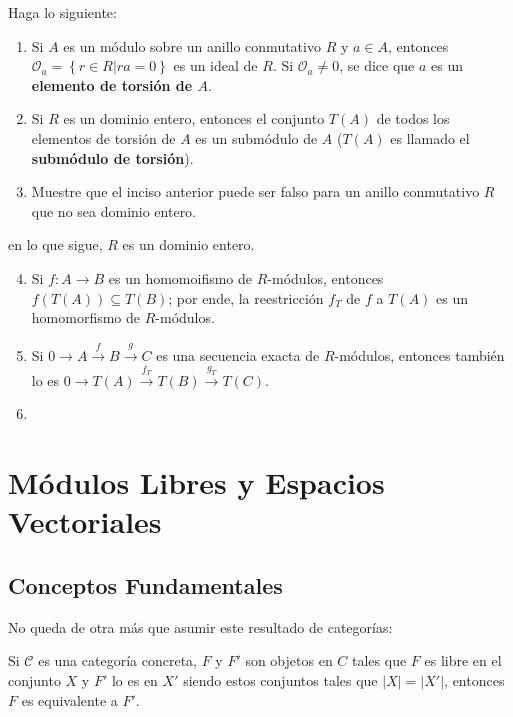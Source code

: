 \documentclass[12pt]{report}
\newcounter{it}
\theoremstyle{largebreak}
\newcommand\abs[1]{\ensuremath{\big|#1\big|}}
\newcommand\cf[3]{\ensuremath{#1:#2\rightarrow#3}}
\begin{document}
    \begin{excer}
        Haga lo siguiente:
        \begin{enumerate}[label = \textit{(\alph*)}]
            \item Si $A$ es un módulo sobre un anillo conmutativo $R$ y $a\in A$, entonces $\mathcal{O}_a=\left\{r\in R\Big|ra=0 \right\}$ es un ideal de $R$. Si $\mathcal{O}_a\neq0$, se dice que $a$ es un \textbf{elemento de torsión de $A$}.
            \item Si $R$ es un dominio entero, entonces el conjunto $T(A)$ de todos los elementos de torsión de $A$ es un submódulo de $A$ ($T(A)$ es llamado el \textbf{submódulo de torsión}).
            \item Muestre que el inciso anterior puede ser falso para un anillo conmutativo $R$ que no sea dominio entero.
        \end{enumerate}
        en lo que sigue, $R$ es un dominio entero.
        \begin{enumerate}[label = \textit{(\alph*)}]
            \setcounter{enumi}{3}
            \item Si $\cf{f}{A}{B}$ es un homomoifismo de $R$-módulos, entonces $f(T(A))\subseteq T(B)$; por ende, la reestricción $f_T$ de $f$ a $T(A)$ es un homomorfismo de $R$-módulos.
            \item Si $0\rightarrow A\overset{f}{\rightarrow}B\overset{g}{\rightarrow}C$ es una secuencia exacta de $R$-módulos, entonces también lo es $0\rightarrow T(A)\overset{f_T}{\rightarrow}T(B)\overset{g_T}{\rightarrow}T(C)$.
            \item 
        \end{enumerate}
    \end{excer}

    \newpage

    \chapter{Módulos Libres y Espacios Vectoriales}

    \section{Conceptos Fundamentales}

    No queda de otra más que asumir este resultado de categorías:

    \begin{theor}
        Si $\mathcal{C}$ es una categoría concreta, $F$ y $F'$ son objetos en $C$ tales que $F$ es libre en el conjunto $X$ y $F'$ lo es en $X'$ siendo estos conjuntos tales que $\abs{X}=\abs{X'}$, entonces $F$ es equivalente a $F'$.
    \end{theor}
\end{document}

